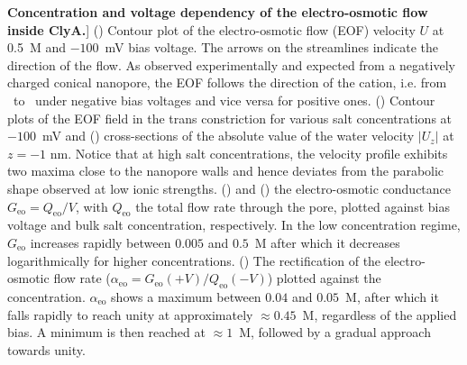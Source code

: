 \begin{figure*}[htbp]
\caption
[\textbf{Concentration and voltage dependency of the electro-osmotic flow inside ClyA.}]
{
() Contour plot of the electro-osmotic flow (EOF) velocity $U$ at 0.5~M and 
$-100$~mV bias voltage. The arrows on the streamlines indicate the direction of the flow. As observed 
experimentally\cite{soskine2013} and expected from a negatively charged conical nanopore, the EOF follows the 
direction of the cation, i.e. from \cis\ to \trans\ under negative bias voltages and vice versa for positive 
ones.
()
Contour plots of the EOF field in the trans constriction for various salt concentrations at $-100$~mV and
()
cross-sections of the absolute value of the water velocity $\left|U_z\right|$ at $z=-1\text{~nm}$. Notice 
that at high salt concentrations, the velocity profile exhibits two maxima close to the nanopore walls and 
hence deviates from the parabolic shape observed at low ionic strengths.
() and () the 
electro-osmotic conductance $G_\text{eo} = Q_\text{eo}/V$, with $Q_\text{eo}$ the total flow rate through
the pore, plotted against bias voltage and bulk salt concentration, respectively. In the low concentration 
regime, $G_\text{eo}$ increases rapidly between $0.005$ and $0.5$~M after which it decreases logarithmically 
for higher concentrations.
()
The rectification of the electro-osmotic flow rate ($\alpha_\text{eo} = G_\text{eo}(+V)/Q_\text{eo}(-V)$) 
plotted against the concentration. $\alpha_\text{eo}$ shows a maximum between $0.04$ and $0.05$~M, after 
which it falls rapidly to reach unity at approximately $\approx0.45$~M, regardless of the applied bias. A 
minimum is then reached at $\approx1$~M, followed by a gradual approach towards unity.
}

\label{fig:electro-osmotic_flow}

\end{figure*}
